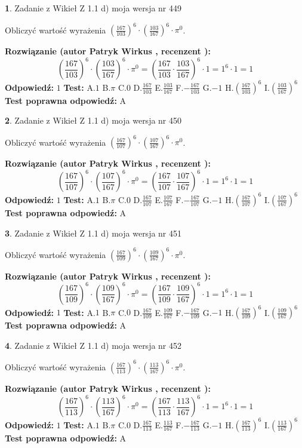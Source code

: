 \documentclass[12pt, a4paper]{article}
\theoremstyle{definition} %
\newtheorem{zad}{}
\newcommand{\zadStart}[1]{\begin{zad}#1\newline}
\newcommand{\zadStop}{\end{zad}}
\newcommand{\rozwStart}[2]{\noindent \textbf{Rozwiązanie (autor #1 , recenzent #2): }\newline}
\newcommand{\rozwStop}{\newline}
\newcommand{\odpStart}{\noindent \textbf{Odpowiedź:}\newline}
\newcommand{\odpStop}{\newline}
\newcommand{\testStart}{\noindent \textbf{Test:}\newline}
\newcommand{\testStop}{\newline}
\newcommand{\kluczStart}{\noindent \textbf{Test poprawna odpowiedź:}\newline}
\newcommand{\kluczStop}{\newline}
\begin{document}
\zadStart{Zadanie z Wikieł Z 1.1 d) moja wersja nr 449}

Obliczyć wartość wyrażenia $(\frac{167}{103})^{6} \cdot (\frac{103}{167})^{6} \cdot \pi^{0}$.
\zadStop
\rozwStart{Patryk Wirkus}{}
$$(\frac{167}{103})^{6} \cdot (\frac{103}{167})^{6} \cdot \pi^{0} = (\frac{167}{103} \cdot \frac{103}{167})^{6} \cdot 1 = 1^{6} \cdot 1 = 1$$
\rozwStop
\odpStart
$1$
\odpStop
\testStart
A.$1$ B.$\pi$ C.$0$ D.$\frac{167}{103}$ E.$\frac{103}{167}$
F.$-\frac{167}{103}$ G.$-1$
H.$(\frac{167}{103})^{6}$
I.$(\frac{103}{167})^{6}$
\testStop
\kluczStart
A
\kluczStop



\zadStart{Zadanie z Wikieł Z 1.1 d) moja wersja nr 450}

Obliczyć wartość wyrażenia $(\frac{167}{107})^{6} \cdot (\frac{107}{167})^{6} \cdot \pi^{0}$.
\zadStop
\rozwStart{Patryk Wirkus}{}
$$(\frac{167}{107})^{6} \cdot (\frac{107}{167})^{6} \cdot \pi^{0} = (\frac{167}{107} \cdot \frac{107}{167})^{6} \cdot 1 = 1^{6} \cdot 1 = 1$$
\rozwStop
\odpStart
$1$
\odpStop
\testStart
A.$1$ B.$\pi$ C.$0$ D.$\frac{167}{107}$ E.$\frac{107}{167}$
F.$-\frac{167}{107}$ G.$-1$
H.$(\frac{167}{107})^{6}$
I.$(\frac{107}{167})^{6}$
\testStop
\kluczStart
A
\kluczStop



\zadStart{Zadanie z Wikieł Z 1.1 d) moja wersja nr 451}

Obliczyć wartość wyrażenia $(\frac{167}{109})^{6} \cdot (\frac{109}{167})^{6} \cdot \pi^{0}$.
\zadStop
\rozwStart{Patryk Wirkus}{}
$$(\frac{167}{109})^{6} \cdot (\frac{109}{167})^{6} \cdot \pi^{0} = (\frac{167}{109} \cdot \frac{109}{167})^{6} \cdot 1 = 1^{6} \cdot 1 = 1$$
\rozwStop
\odpStart
$1$
\odpStop
\testStart
A.$1$ B.$\pi$ C.$0$ D.$\frac{167}{109}$ E.$\frac{109}{167}$
F.$-\frac{167}{109}$ G.$-1$
H.$(\frac{167}{109})^{6}$
I.$(\frac{109}{167})^{6}$
\testStop
\kluczStart
A
\kluczStop



\zadStart{Zadanie z Wikieł Z 1.1 d) moja wersja nr 452}

Obliczyć wartość wyrażenia $(\frac{167}{113})^{6} \cdot (\frac{113}{167})^{6} \cdot \pi^{0}$.
\zadStop
\rozwStart{Patryk Wirkus}{}
$$(\frac{167}{113})^{6} \cdot (\frac{113}{167})^{6} \cdot \pi^{0} = (\frac{167}{113} \cdot \frac{113}{167})^{6} \cdot 1 = 1^{6} \cdot 1 = 1$$
\rozwStop
\odpStart
$1$
\odpStop
\testStart
A.$1$ B.$\pi$ C.$0$ D.$\frac{167}{113}$ E.$\frac{113}{167}$
F.$-\frac{167}{113}$ G.$-1$
H.$(\frac{167}{113})^{6}$
I.$(\frac{113}{167})^{6}$
\testStop
\kluczStart
A
\kluczStop
\end{document}
